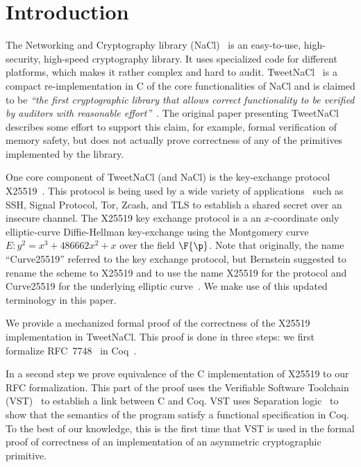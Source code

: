 \section{Introduction}
\label{sec:intro}

The Networking and Cryptography library (NaCl)~\cite{BLS12}
is an easy-to-use, high-security, high-speed cryptography library.
It uses specialized code for different platforms, which makes it rather complex and hard to audit.
TweetNaCl~\cite{BGJ+15} is a compact re-implementation in C
of the core functionalities of NaCl and is claimed to be
\emph{``the first cryptographic library that allows correct functionality
to be verified by auditors with reasonable effort''}~\cite{BGJ+15}.
The original paper presenting TweetNaCl describes some effort to support
this claim, for example, formal verification of memory safety, but does not actually
prove correctness of any of the primitives implemented by the library.

One core component of TweetNaCl (and NaCl) is the key-exchange protocol X25519~\cite{rfc7748}.
This protocol is being used by a wide variety of applications~\cite{things-that-use-curve25519}
such as SSH, Signal Protocol, Tor, Zcash, and TLS to establish a shared secret over
an insecure channel.
The X25519 key exchange protocol is a an $x$-coordinate only
elliptic-curve Diffie-Hellman key-exchange using the Montgomery
curve $E: y^2 = x^3 + 486662 x^2 + x$ over the field $\F{\p}$.
Note that originally, the name ``Curve25519'' referred to the key exchange protocol,
but Bernstein suggested to rename the scheme to X25519 and to use the name
X25519 for the protocol and Curve25519 for the underlying elliptic curve~\cite{Ber14}.
We make use of this updated terminology in this paper.

We provide a mechanized formal proof of the correctness of the X25519
implementation in TweetNaCl.
This proof is done in three steps:
we first formalize RFC~7748~\cite{rfc7748} in Coq~\cite{coq-faq}.

In a second step we prove equivalence of the C implementation of X25519
to our RFC formalization.
This part of the proof uses the Verifiable Software Toolchain (VST)~\cite{2012-Appel}
to establish a link between C and Coq.
VST uses Separation logic~\cite{1969-Hoare,Reynolds02separationlogic}
to show that the semantics of the program satisfy a functional specification in Coq.
To the best of our knowledge, this is the first time that
VST is used in the formal proof of correctness of an implementation
of an asymmetric cryptographic primitive.

